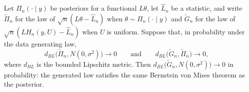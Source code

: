 \begin{proposition}
\label{prop:bvm_generators}
Let $\Pi_n(\cdot\mid y)$ be posteriors for a functional $L\theta$, let $\hat L_n$ be a statistic, and write $\tilde\Pi_n$ for the law of $\sqrt n(L\theta-\hat L_n)$ when $\theta\sim\Pi_n(\cdot\mid y)$ and $\tilde G_n$ for the law of $\sqrt n(LH_n(y,U)-\hat L_n)$ when $U$ is uniform. Suppose that, in probability under the data generating law,
\[
d_{BL}\big(\tilde\Pi_n,N(0,\sigma^2)\big)\to0\qquad\text{and}\qquad d_{BL}\big(\tilde G_n,\tilde\Pi_n\big)\to0,
\]
where $d_{BL}$ is the bounded Lipschitz metric. Then $d_{BL}\big(\tilde G_n,N(0,\sigma^2)\big)\to0$ in probability: the generated law satisfies the same Bernstein von Mises theorem as the posterior.
\end{proposition}

